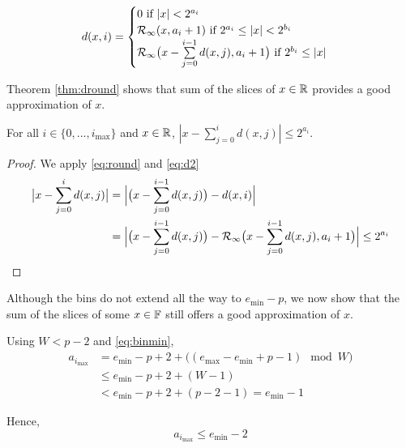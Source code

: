     \begin{equation}
      d(x, i) = \begin{cases}
        0 \text{ if } |x| < 2^{a_i}\\
        \mathcal{R}_\text{$\infty$}(x, a_i + 1) \text{ if } 2^{a_i} \leq |x| < 2^{b_i}\\
        \mathcal{R}_\text{$\infty$}\bigl(x - \sum\limits_{j=0}^{i - 1}d(x,j), a_i + 1\bigr) \text{ if } 2^{b_i} \leq |x|
        \end{cases}
      \label{eq:d2}
    \end{equation}

    Theorem \ref{thm:dround} shows that sum of the slices of $x \in \mathbb{R}$
    provides a good approximation of $x$.

    \begin{samepage}
    \begin{thm}
      For all $i \in \{0, ..., i_{\max}\}$ and $x \in \mathbb{R}$,
      $|x - \sum \limits_{j = 0}^id(x, j)| \leq 2^{a_i}$.
      \label{thm:dround}
    \end{thm}
    \end{samepage}

    \begin{proof}
      We apply  \eqref{eq:round} and \eqref{eq:d2}
      \begin{align*}
        \bigl|x - \sum \limits_{j = 0}^{i}d(x, j)\bigr| & = \Bigl|\bigl(x - \sum \limits_{j = 0}^{i - 1}d(x, j)\bigr) - d(x, i)\Bigr| \\
         & = \Bigl|\bigl(x - \sum \limits_{j = 0}^{i - 1}d(x, j)\bigr) - \mathcal{R}_\text{$\infty$}\bigl(x - \sum \limits_{j = 0}^{i - 1}d(x, j), a_{i} + 1\bigr)\Bigr| \leq 2^{a_{i}}
      \end{align*}
    \end{proof}

    Although the bins do not extend all the way to $e_{\min} - p$, we now
    show that the sum of the slices of some $x \in \mathbb{F}$ still offers a good
    approximation of $x$.

    Using $W < p - 2$ and \eqref{eq:binmin},
    \begin{align*}
      a_{i_{\max}} & = e_{\min} - p + 2 + \bigl((e_{\max} - e_{\min} + p - 1 ) \mod W \bigr) \\
          & \leq e_{\min} - p + 2 + (W - 1) \\
          & < e_{\min} - p + 2 + (p - 2 - 1) =  e_{\min} - 1 
    \end{align*}

    Hence,
    \[
      a_{i_{\max}} \leq e_{\min} - 2
    \]

